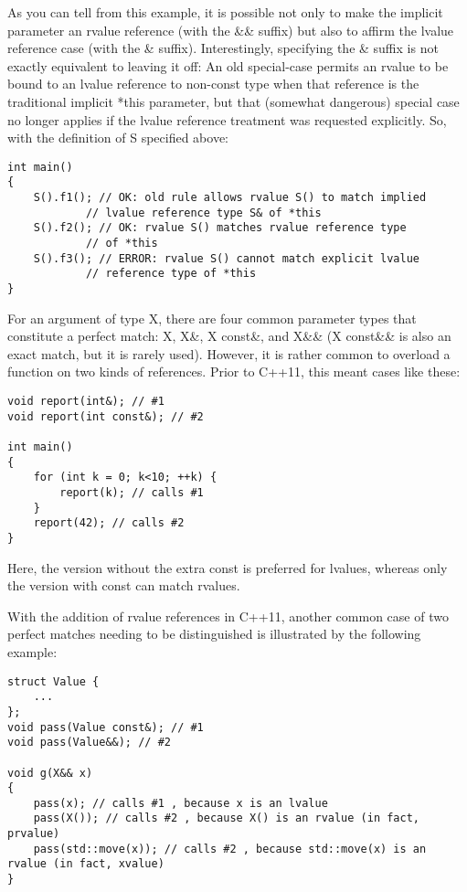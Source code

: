 As you can tell from this example, it is possible not only to make the implicit parameter an rvalue reference (with the \&\& suffix) but also to affirm the lvalue reference case (with the \& suffix). Interestingly, specifying the \& suffix is not exactly equivalent to leaving it off: An old special-case permits an rvalue to be bound to an lvalue reference to non-const type when that reference is the traditional implicit *this parameter, but that (somewhat dangerous) special case no longer applies if the lvalue reference treatment was requested explicitly. So, with the definition of S specified above:

\begin{lstlisting}[style=styleCXX]
int main()
{
	S().f1(); // OK: old rule allows rvalue S() to match implied
			// lvalue reference type S& of *this
	S().f2(); // OK: rvalue S() matches rvalue reference type
			// of *this
	S().f3(); // ERROR: rvalue S() cannot match explicit lvalue
			// reference type of *this
}
\end{lstlisting}



For an argument of type X, there are four common parameter types that constitute a perfect match: X, X\&, X const\&, and X\&\& (X const\&\& is also an exact match, but it is rarely used). However, it is rather common to overload a function on two kinds of references. Prior to C++11, this meant cases like these:

\begin{lstlisting}[style=styleCXX]
void report(int&); // #1
void report(int const&); // #2

int main()
{
	for (int k = 0; k<10; ++k) {
		report(k); // calls #1
	}
	report(42); // calls #2
}
\end{lstlisting}

Here, the version without the extra const is preferred for lvalues, whereas only the version with const can match rvalues.

With the addition of rvalue references in C++11, another common case of two perfect matches needing to be distinguished is illustrated by the following example:

\begin{lstlisting}[style=styleCXX]
struct Value {
	...
};
void pass(Value const&); // #1
void pass(Value&&); // #2

void g(X&& x)
{
	pass(x); // calls #1 , because x is an lvalue
	pass(X()); // calls #2 , because X() is an rvalue (in fact, prvalue)
	pass(std::move(x)); // calls #2 , because std::move(x) is an rvalue (in fact, xvalue)
}
\end{lstlisting}

